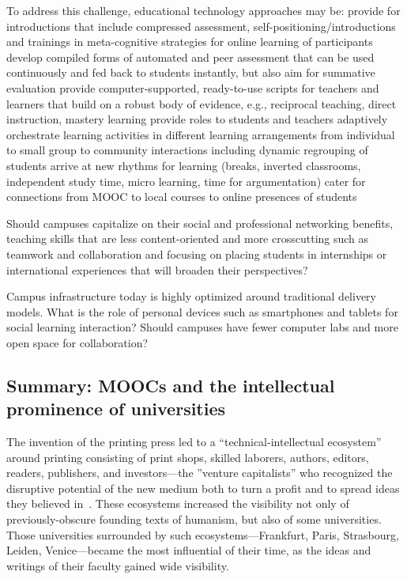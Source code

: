 To address this challenge, educational technology
approaches may be: provide for introductions that include compressed
assessment, self-positioning/introductions and trainings in
meta-cognitive strategies for online learning of participants develop
compiled forms of automated and peer assessment that can be used
continuously and fed back to students instantly, but also aim for
summative evaluation provide computer-supported, ready-to-use scripts
for teachers and learners that build on a robust body of evidence, e.g.,
reciprocal teaching, direct instruction, mastery learning provide roles
to students and teachers adaptively orchestrate learning activities in
different learning arrangements from individual to small group to
community interactions including dynamic regrouping of students arrive
at new rhythms for learning (breaks, inverted classrooms, independent
study time, micro learning, time for argumentation) cater for
connections from MOOC to local courses to online presences of students

 Should campuses capitalize on their social and professional
  networking benefits, teaching skills that are less content-oriented
  and more crosscutting such as teamwork and collaboration and focusing
  on placing students in internships or international experiences that
  will broaden their perspectives?

 Campus infrastructure today is highly optimized around traditional
  delivery models.  What is
the role of personal devices such as smartphones and tablets for social
learning interaction? Should campuses 
  have fewer computer labs and more open space for collaboration?  


\subsection{Summary: MOOCs and the intellectual prominence of universities}

The invention of the printing press led to a  ``technical-intellectual
ecosystem'' around printing consisting of print shops, skilled laborers,
authors, editors, readers, publishers, and investors---the ''venture
capitalists'' who recognized the 
disruptive potential of the new medium both to turn a profit and to
spread ideas they 
believed in~\cite{lefebvre}.
These ecosystems increased the visibility not only of previously-obscure
founding texts of humanism, but also of some universities.
Those universities surrounded by such ecosystems---Frankfurt, Paris,
Strasbourg, Leiden, Venice---became the most influential of their
time, as the ideas and writings of their faculty gained wide visibility.

